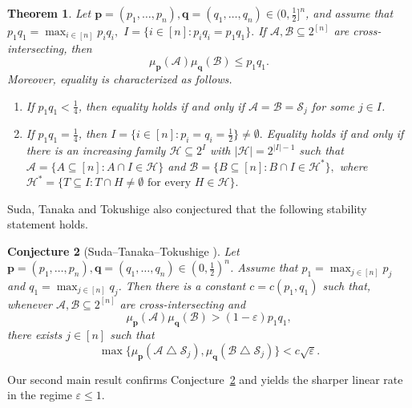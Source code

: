 \documentclass[11pt]{article}
\numberwithin{equation}{section}
\newtheorem{theorem}{Theorem}[section]
\newtheorem{conjecture}[theorem]{Conjecture}
\theoremstyle{definition}
\theoremstyle{remark}
\newcommand{\symdiff}{\mathbin{\triangle}}
\begin{document}
\begin{theorem}\label{thm:main-product}
Let $\mathbf p=(p_1,\ldots,p_n), \mathbf q=(q_1,\ldots,q_n)\in(0,\frac{1}{2}]^n$,  and assume that
$
p_1q_1=\max_{i\in[n]}p_iq_i,
$
$
 I=\{i\in[n]:p_iq_i=p_1q_1\}.
$
If $\mathcal{A},\mathcal{B}\subseteq2^{[n]}$ are cross-intersecting, then
$$
 \mu_{\mathbf p}(\mathcal{A})\mu_{\mathbf q}(\mathcal{B})\leq p_1q_1.
$$
Moreover, equality is characterized as follows.
\begin{enumerate}[label=\textup{(\roman*)},leftmargin=2.2em]
 \item If $p_1q_1<\frac{1}{4}$, then equality holds if and only if
 $
  \mathcal{A}=\mathcal{B}=\mathcal{S}_j
$
 for some $j\in I$.
 \item If $p_1q_1=\frac{1}{4}$, then
$
  I=\{i\in[n]:p_i=q_i=\frac{1}{2}\}\neq \emptyset.
$
Equality holds if and only if there is an increasing family $\mathcal{H}\subseteq2^I$ with $|\mathcal{H}|=2^{|I|-1}$ such that
 $
  \mathcal{A}=\{A\subseteq[n]:A\cap I\in\mathcal{H}\}
$ 
and
$
 \mathcal{B}=\{B\subseteq[n]:B\cap I\in\mathcal{H}^*\},
$
 where
$
  \mathcal{H}^*
  =\{T\subseteq I: T\cap H\neq\emptyset\text{ for every }H\in\mathcal{H}\}.
 $
\end{enumerate}
\end{theorem}


Suda, Tanaka and Tokushige \cite{STT} also conjectured that  the following stability statement holds.


\begin{conjecture}[Suda--Tanaka--Tokushige \cite{STT}]\label{conj:stability}
Let $\mathbf p=(p_1,\ldots,p_n), \mathbf q=(q_1,\ldots,q_n)\in(0,\frac{1}{2})^n$. Assume that $p_1=\max_{j\in[n]}p_j$ and $q_1=\max_{j\in[n]}q_j$.
Then there is a constant $c=c(p_1,q_1)$ such that, whenever $\mathcal{A},\mathcal{B}\subseteq2^{[n]}$ are cross-intersecting and
\begin{equation*}
 \mu_{\mathbf p}(\mathcal{A})\mu_{\mathbf q}(\mathcal{B})>(1-\varepsilon)p_1q_1,
\end{equation*}
there exists $j\in[n]$ such that
\begin{equation*}
 \max\bigl\{
 \mu_{\mathbf p}(\mathcal{A}\symdiff\mathcal{S}_j),
 \mu_{\mathbf q}(\mathcal{B}\symdiff\mathcal{S}_j)
 \bigr\}
 < c\sqrt\varepsilon.
\end{equation*}
\end{conjecture}



Our second main result  confirms Conjecture~\ref{conj:stability} and yields the sharper linear rate in the regime $\varepsilon\leq1$.
\end{document}
